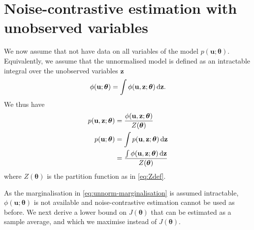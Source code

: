 \documentclass[11pt, oneside]{article}
\newcommand{\thetab}{{\boldsymbol{\theta}}}
\newcommand{\pnorm}{p}
\newcommand{\pnn}{\phi}
\renewcommand{\u}{{\mathbf u}}
\newcommand{\z}{{\mathbf z}}
\begin{document}
\section{Noise-contrastive estimation with unobserved variables}
We now assume that not have data on all variables of the model
$\pnorm(\u;\thetab)$. Equivalently, we assume that the unnormalised
model is defined as an intractable integral over the unobserved variables $\z$
\begin{align}
  \pnn(\u;\thetab) = \int \pnn(\u, \z;\thetab) \dif \z. \label{eq:unnorm-marginalisation}
\end{align}
We thus have
\begin{align}
  \pnorm(\u,\z;\thetab) &= \frac{\pnn(\u, \z;\thetab)}{Z(\thetab)}\\
  \pnorm(\u; \thetab) &= \int \pnorm(\u, \z;\thetab) \dif \z\\
&=  \frac{\int \pnn(\u, \z;\thetab) \dif \z}{Z(\thetab)}
\end{align}
where $Z(\thetab)$ is the partition function as in \eqref{eq:Zdef}.

As the marginalisation in \eqref{eq:unnorm-marginalisation} is assumed
intractable, $\pnn(\u;\thetab)$ is not available and noise-contrastive
estimation cannot be used as before. We next derive a lower bound on
$J(\thetab)$ that can be estimated as a sample average, and which we maximise instead of $J(\thetab)$.
\end{document}
